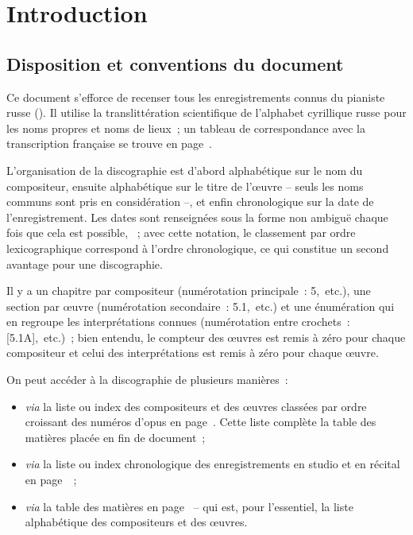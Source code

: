 \chapter[%
Introduction][%
Introduction]{%
Introduction}
\label{chap:Introduction}

\section{Disposition et conventions du document}

Ce document s'efforce de recenser tous les enregistrements connus du
pianiste russe \VSofronitsky{} ().
Il utilise la translittération scientifique de l'alphabet cyrillique russe
pour les noms propres et noms de lieux~; un tableau de correspondance avec
la transcription française se trouve en page~\pageref{tab:Correspondance}.

L'organisation de la discographie est d'abord alphabétique sur le nom du
compositeur, ensuite alphabétique sur le titre de l'œuvre -- seuls les noms
communs sont pris en considération --, et enfin chronologique sur la date de
l'enregistrement.
Les dates sont renseignées sous la forme non ambiguë \citet{ISO8601} chaque
fois que cela est possible, \cad {}~; avec cette notation,
le classement par ordre lexicographique correspond à l'ordre chronologique,
ce qui constitue un second avantage pour une discographie.

Il y a un chapitre par compositeur (numérotation principale~: 5,~etc.), une
section par œuvre (numérotation secondaire~: 5.1,~etc.) et une énumération
qui en regroupe les interprétations connues (numérotation entre crochets~:
[5.1A],~etc.)~; bien entendu, le compteur des œuvres est remis à zéro pour
chaque compositeur et celui des interprétations est remis à zéro pour chaque
œuvre.

On peut accéder à la discographie de plusieurs manières~:
\begin{itemize}
 \item
 \emph{via} la liste ou index des compositeurs et des œuvres classées par
 ordre croissant des numéros d'opus en page~\pageref{chap:Oeuvres}.
 Cette liste complète la table des matières placée en fin de document~;
 \item
 \emph{via} la liste ou index chronologique des enregistrements en studio et
 en récital en page~\pageref{chap:Chronologie}~;
 \item
 \emph{via} la table des matières en page~\pageref{chap:Tabledesmatieres} --
 qui est, pour l'essentiel, la liste alphabétique des compositeurs et des
 œuvres.
\end{itemize}

